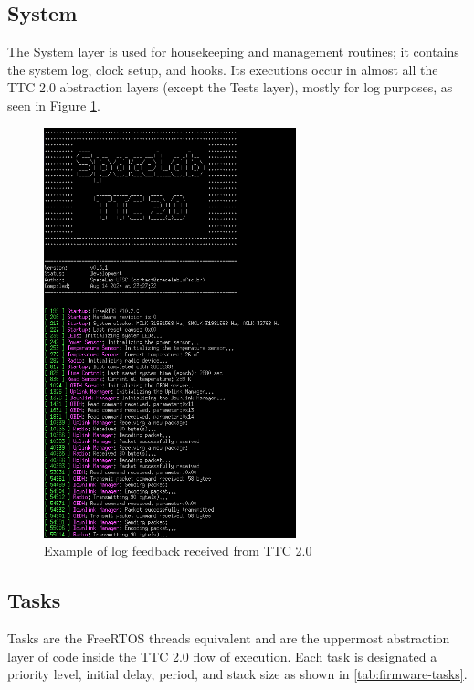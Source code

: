 \subsection{System}

The System layer is used for housekeeping and management routines; it contains the system log, clock setup, and hooks. Its executions occur in almost all the TTC 2.0 abstraction layers (except the Tests layer), mostly for log purposes, as seen in Figure \ref{fig:log_info}.

\begin{figure}[!ht]
	\begin{center}
		\includegraphics[width=0.65\textwidth]{figures/ttc2-terminal-log.png}
		\caption{Example of log feedback received from TTC 2.0}
		\label{fig:log_info}
	\end{center}
\end{figure}

\subsection{Tasks}

Tasks are the FreeRTOS threads equivalent and are the uppermost abstraction layer of code inside the TTC 2.0 flow of execution. Each task is designated a priority level, initial delay, period, and stack size as shown in \autoref{tab:firmware-tasks}.

